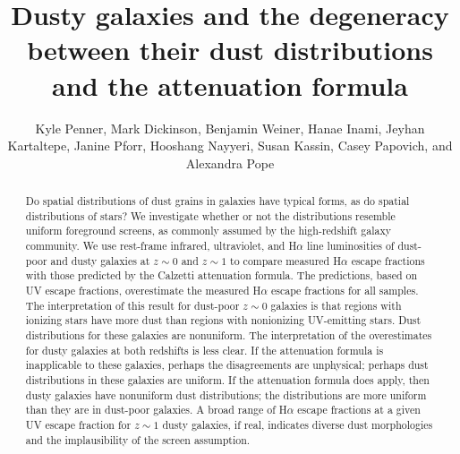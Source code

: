 \documentclass[preprint]{aastex}
\begin{document}
\title{Dusty galaxies and the degeneracy between their dust distributions and
the attenuation formula}

\author{Kyle Penner, Mark Dickinson,
Benjamin Weiner, Hanae Inami,
Jeyhan Kartaltepe, Janine Pforr,
Hooshang Nayyeri,
Susan Kassin,
Casey Papovich, and
Alexandra Pope
}




\begin{abstract}
Do spatial distributions of dust grains in galaxies have typical forms, as do
spatial distributions of stars?  We investigate whether or not the distributions
resemble
uniform foreground screens, as commonly assumed by the high-redshift galaxy
community.  We use rest-frame infrared,
ultraviolet, and H$\alpha$ line luminosities of dust-poor and dusty galaxies
at $z \sim 0$ and $z \sim 1$ to compare measured H$\alpha$ escape fractions
with those predicted by the Calzetti attenuation formula.  The predictions,
based on
UV escape fractions, overestimate the measured H$\alpha$ escape fractions for
all samples.  The
interpretation of this result for dust-poor $z \sim 0$ galaxies is that regions
with ionizing stars have more dust than regions with nonionizing UV-emitting
stars.  Dust distributions for these galaxies are nonuniform.  The
interpretation of the overestimates for dusty galaxies at both redshifts is
less clear.  If the attenuation formula is inapplicable to these galaxies,
perhaps the disagreements are unphysical; perhaps dust distributions in
these galaxies are uniform.  If the attenuation formula does apply, then dusty
galaxies have nonuniform dust distributions; the distributions are more
uniform than they are in dust-poor galaxies.  A broad range of H$\alpha$ escape
fractions at a given UV escape fraction for $z \sim 1$ dusty galaxies, if real,
indicates diverse dust morphologies and the implausibility of the screen
assumption.
\end{abstract}
\end{document}
